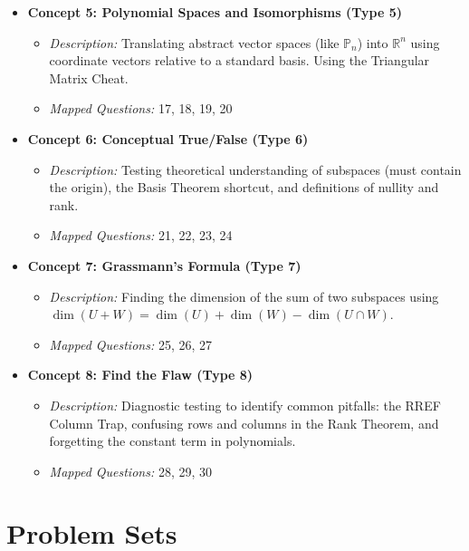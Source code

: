\documentclass{article}
\begin{document}
\begin{itemize}
    \item \textbf{Concept 5: Polynomial Spaces and Isomorphisms (Type 5)}
    \begin{itemize}
        \item \textit{Description:} Translating abstract vector spaces (like $\mathbb{P}_n$) into $\mathbb{R}^n$ using coordinate vectors relative to a standard basis. Using the Triangular Matrix Cheat.
        \item \textit{Mapped Questions:} 17, 18, 19, 20
    \end{itemize}

    \item \textbf{Concept 6: Conceptual True/False (Type 6)}
    \begin{itemize}
        \item \textit{Description:} Testing theoretical understanding of subspaces (must contain the origin), the Basis Theorem shortcut, and definitions of nullity and rank.
        \item \textit{Mapped Questions:} 21, 22, 23, 24
    \end{itemize}

    \item \textbf{Concept 7: Grassmann's Formula (Type 7)}
    \begin{itemize}
        \item \textit{Description:} Finding the dimension of the sum of two subspaces using $\dim(U + W) = \dim(U) + \dim(W) - \dim(U \cap W)$.
        \item \textit{Mapped Questions:} 25, 26, 27
    \end{itemize}

    \item \textbf{Concept 8: Find the Flaw (Type 8)}
    \begin{itemize}
        \item \textit{Description:} Diagnostic testing to identify common pitfalls: the RREF Column Trap, confusing rows and columns in the Rank Theorem, and forgetting the constant term in polynomials.
        \item \textit{Mapped Questions:} 28, 29, 30
    \end{itemize}
\end{itemize}

\newpage

\section{Problem Sets}
\end{document}
